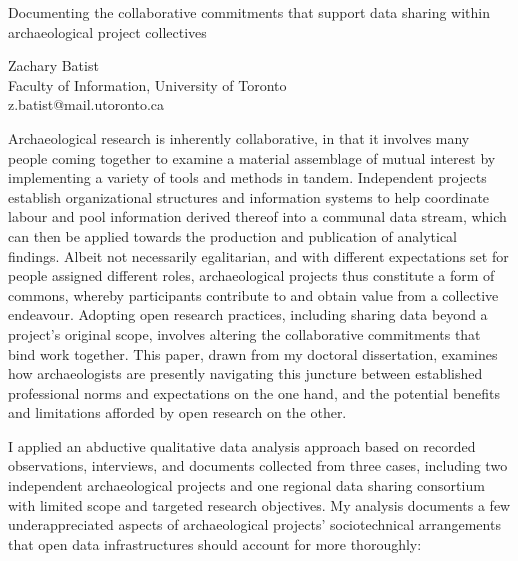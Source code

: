 \documentclass[a4paper]{article}
\begin{document}

\large
\begin{center}
Documenting the collaborative commitments that support data sharing within archaeological project collectives

\large
Zachary Batist\\

\small  
Faculty of Information, University of Toronto\\
z.batist@mail.utoronto.ca\\

\end{center}

\normalsize

Archaeological research is inherently collaborative, in that it involves many people coming together to examine a material assemblage of mutual interest by implementing a variety of tools and methods in tandem. Independent projects establish organizational structures and information systems to help coordinate labour and pool information derived thereof into a communal data stream, which can then be applied towards the production and publication of analytical findings. Albeit not necessarily egalitarian, and with different expectations set for people assigned different roles, archaeological projects thus constitute a form of commons, whereby participants contribute to and obtain value from a collective endeavour. Adopting open research practices, including sharing data beyond a project's original scope, involves altering the collaborative commitments that bind work together. This paper, drawn from my doctoral dissertation, examines how archaeologists are presently navigating this juncture between established professional norms and expectations on the one hand, and the potential benefits and limitations afforded by open research on the other.

I applied an abductive qualitative data analysis approach based on recorded observations, interviews, and documents collected from three cases, including two independent archaeological projects and one regional data sharing consortium with limited scope and targeted research objectives. My analysis documents a few underappreciated aspects of archaeological projects' sociotechnical arrangements that open data infrastructures should account for more thoroughly:
\end{document}
